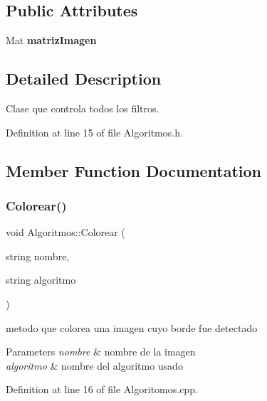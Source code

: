 \subsection*{Public Attributes}
\begin{DoxyCompactItemize}
\item 
\mbox{\label{class_algoritmos_ab067e11b44ec1a37daac3ba7e50662bb}} 
Mat {\bfseries matriz\+Imagen}
\end{DoxyCompactItemize}


\subsection{Detailed Description}
Clase que controla todos los filtros. 

Definition at line 15 of file Algoritmos.\+h.



\subsection{Member Function Documentation}
\mbox{\label{class_algoritmos_a3ec1633159cdf5b3e1a9c8a86df151cd}} 
\subsubsection{\texorpdfstring{Colorear()}{Colorear()}}
{\footnotesize\ttfamily void Algoritmos\+::\+Colorear (\begin{DoxyParamCaption}\item[{string}]{nombre,  }\item[{string}]{algoritmo }\end{DoxyParamCaption})}



metodo que colorea una imagen cuyo borde fue detectado 


\begin{DoxyParams}{Parameters}
{\em nombre} & nombre de la imagen \\
\hline
{\em algoritmo} & nombre del algoritmo usado \\
\hline
\end{DoxyParams}


Definition at line 16 of file Algoritomos.\+cpp.

\mbox{\label{class_algoritmos_a1b33bd5f66e762cd3cd6e238c96c6b7e}} 
